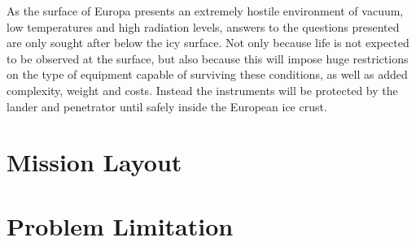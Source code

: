 As the surface of Europa presents an extremely hostile environment of vacuum, low temperatures and high radiation levels, answers to the questions presented are only sought after below the icy surface. Not only because life is not expected to be observed at the surface, but also because this will impose huge restrictions on the type of equipment capable of surviving these conditions, as well as added complexity, weight and costs. Instead the instruments will be protected by the lander and penetrator until safely inside the European ice crust.



\section{Mission Layout}

%




\section{Problem Limitation}

